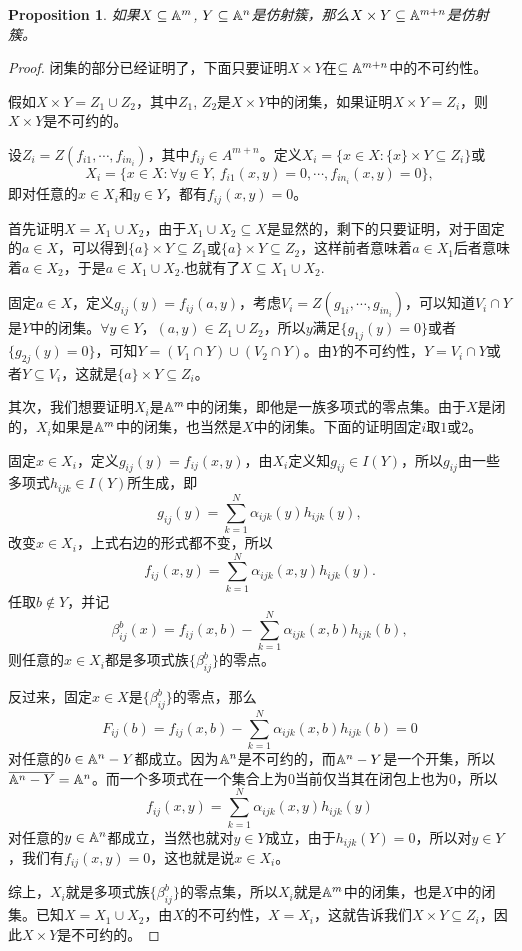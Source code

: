 \documentclass[9pt]{extarticle}
\theoremstyle{plain}%
\newtheorem{pro}[defi]{Proposition}%
\begin{document}
\begin{pro}
	如果$X\subseteq \mathbb{A}^{m}$, $Y\subseteq \mathbb{A}^{n}$是仿射簇，那么$X\times Y\subseteq \mathbb{A}^{m+n}$是仿射簇。
	\label{c3:p18}
\end{pro}
\begin{proof}
	闭集的部分已经证明了，下面只要证明$X\times Y$在$\subseteq \mathbb{A}^{m+n}$中的不可约性。

	假如$X\times Y=Z_1\cup Z_2$，其中$Z_1$, $Z_2$是$X\times Y$中的闭集，如果证明$X\times Y=Z_i$，则$X\times Y$是不可约的。

	设$Z_i=Z(f_{i1},\cdots,f_{in_i})$，其中$f_{ij}\in A^{m+n}$。定义$X_i=\bigl\{x\in X:\{x\}\times Y\subseteq Z_i\bigr\}$或
	\[
		X_i=\bigl\{x\in X:\forall y\in Y,\,f_{i1}(x,y)=0,\cdots ,f_{in_i}(x,y)=0\bigr\},
	\]
	即对任意的$x\in X_i$和$y\in Y$，都有$f_{ij}(x,y)=0$。

	首先证明$X=X_1\cup X_2$，由于$X_1\cup X_2\subseteq X$是显然的，剩下的只要证明，对于固定的$a\in X$，可以得到$\{a\}\times Y\subseteq Z_1$或$\{a\}\times Y\subseteq Z_2$，这样前者意味着$a\in X_1$后者意味着$a\in X_2$，于是$a\in X_1\cup X_2$.也就有了$X\subseteq X_1\cup X_2$.

	固定$a\in X$，定义$g_{ij}(y)=f_{ij}(a,y)$，考虑$V_i=Z(g_{1i},\cdots,g_{in_i})$，可以知道$V_i\cap Y$是$Y$中的闭集。$\forall y\in Y$，$(a,y)\in Z_1 \cup Z_2$，所以$y$满足$\{g_{1j}(y)=0\}$或者$\{g_{2j}(y)=0\}$，可知$Y=(V_1\cap Y)\cup (V_2\cap Y)$。由$Y$的不可约性，$Y=V_i\cap Y$或者$Y\subseteq V_i$，这就是$\{a\}\times Y\subseteq Z_i$。

	其次，我们想要证明$X_i$是$\mathbb{A}^{m}$中的闭集，即他是一族多项式的零点集。由于$X$是闭的，$X_i$如果是$\mathbb{A}^{m}$中的闭集，也当然是$X$中的闭集。下面的证明固定$i$取$1$或$2$。

	固定$x\in X_i$，定义$g_{ij}(y)=f_{ij}(x,y)$，由$X_i$定义知$g_{ij}\in I(Y)$，所以$g_{ij}$由一些多项式$h_{ijk}\in I(Y)$所生成，即
	\[
		g_{ij}(y)=\sum_{k=1}^N\alpha_{ijk}(y)h_{ijk}(y),
	\]
	改变$x\in X_i$，上式右边的形式都不变，所以
	\[
		f_{ij}(x,y)=\sum_{k=1}^N\alpha_{ijk}(x,y)h_{ijk}(y).
	\]
	任取$b\notin Y$，并记
	\[
		\beta_{ij}^b(x)=f_{ij}(x,b)-\sum_{k=1}^N\alpha_{ijk}(x,b)h_{ijk}(b),
	\]
	则任意的$x\in X_i$都是多项式族$\{\beta_{ij}^b\}$的零点。

	反过来，固定$x\in X$是$\{\beta_{ij}^b\}$的零点，那么
	\[
		F_{ij}(b)=f_{ij}(x,b)-\sum_{k=1}^N\alpha_{ijk}(x,b)h_{ijk}(b)=0
	\]
	对任意的$b\in \mathbb{A}^{n}-Y$都成立。因为$\mathbb{A}^{n}$是不可约的，而$\mathbb{A}^{n}-Y$是一个开集，所以$\overline{\mathbb{A}^{n}-Y}=\mathbb{A}^{n}$。而一个多项式在一个集合上为$0$当前仅当其在闭包上也为$0$，所以
	\[
		f_{ij}(x,y)=\sum_{k=1}^N\alpha_{ijk}(x,y)h_{ijk}(y)
	\]
	对任意的$y\in \mathbb{A}^{n}$都成立，当然也就对$y\in Y$成立，由于$h_{ijk}(Y)=0$，所以对$y\in Y$，我们有$f_{ij}(x,y)=0$，这也就是说$x\in X_i$。

	综上，$X_i$就是多项式族$\{\beta_{ij}^b\}$的零点集，所以$X_i$就是$\mathbb{A}^{m}$中的闭集，也是$X$中的闭集。已知$X=X_1\cup X_2$，由$X$的不可约性，$X=X_i$，这就告诉我们$X\times Y\subseteq Z_i$，因此$X\times Y$是不可约的。
\end{proof}
\end{document}
